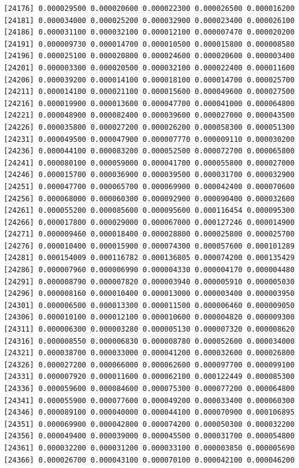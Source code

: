 \documentclass[]{article}
\begin{document}
\begin{verbatim}
[24176] 0.000029500 0.000020600 0.000022300 0.000026500 0.000016200
[24181] 0.000034000 0.000025200 0.000032900 0.000023400 0.000026100
[24186] 0.000031100 0.000032100 0.000012100 0.000007470 0.000020200
[24191] 0.000009730 0.000014700 0.000010500 0.000015800 0.000008580
[24196] 0.000025100 0.000020800 0.000024600 0.000020600 0.000003400
[24201] 0.000003300 0.000020500 0.000032100 0.000022400 0.000011600
[24206] 0.000039200 0.000014100 0.000018100 0.000014700 0.000025700
[24211] 0.000014100 0.000021100 0.000015600 0.000049600 0.000027500
[24216] 0.000019900 0.000013600 0.000047700 0.000041000 0.000064800
[24221] 0.000048900 0.000082400 0.000039600 0.000027000 0.000043500
[24226] 0.000035800 0.000027200 0.000026200 0.000058300 0.000051300
[24231] 0.000049500 0.000047900 0.000007770 0.000009110 0.000030200
[24236] 0.000044100 0.000083200 0.000052500 0.000072700 0.000065800
[24241] 0.000080100 0.000059000 0.000041700 0.000055800 0.000027000
[24246] 0.000015700 0.000036900 0.000039500 0.000031700 0.000032900
[24251] 0.000047700 0.000065700 0.000069900 0.000042400 0.000070600
[24256] 0.000068000 0.000060300 0.000092900 0.000090400 0.000032600
[24261] 0.000055200 0.000085600 0.000095600 0.000116454 0.000095300
[24266] 0.000017800 0.000029000 0.000067000 0.000127246 0.000014900
[24271] 0.000009460 0.000018400 0.000028800 0.000025800 0.000025700
[24276] 0.000010400 0.000015900 0.000074300 0.000057600 0.000101289
[24281] 0.000154009 0.000116782 0.000136805 0.000074200 0.000135429
[24286] 0.000007960 0.000006990 0.000004330 0.000004170 0.000004480
[24291] 0.000008790 0.000007820 0.000003940 0.000005910 0.000005030
[24296] 0.000008160 0.000010400 0.000013000 0.000003400 0.000003950
[24301] 0.000006500 0.000013300 0.000011500 0.000006460 0.000009050
[24306] 0.000010100 0.000012100 0.000010600 0.000004820 0.000009300
[24311] 0.000006300 0.000003280 0.000005130 0.000007320 0.000008620
[24316] 0.000008550 0.000006830 0.000008780 0.000052600 0.000034000
[24321] 0.000038700 0.000033000 0.000041200 0.000032600 0.000026800
[24326] 0.000027200 0.000066000 0.000062600 0.000097700 0.000099100
[24331] 0.000007920 0.000011600 0.000062100 0.000122449 0.000085300
[24336] 0.000059600 0.000084600 0.000075300 0.000077200 0.000064800
[24341] 0.000055900 0.000077600 0.000049200 0.000033400 0.000060300
[24346] 0.000089100 0.000040000 0.000044100 0.000070900 0.000106895
[24351] 0.000069900 0.000042800 0.000074200 0.000050300 0.000032200
[24356] 0.000049400 0.000039000 0.000045500 0.000031700 0.000054800
[24361] 0.000032200 0.000031200 0.000033100 0.000003850 0.000005690
[24366] 0.000026700 0.000043100 0.000070100 0.000042100 0.000046200

\end{verbatim}
\end{document}

